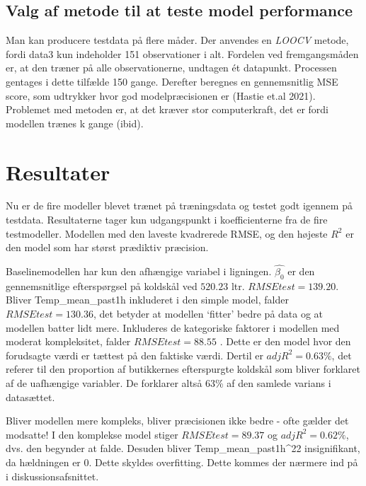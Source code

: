 \documentclass[
  12pt,
  a4paper,
  DIV=11,
  numbers=noendperiod,
  oneside,
  open=any]{scrartcl}
\begin{document}
\hypertarget{valg-af-metode-til-at-teste-model-performance}{%
\subsection{Valg af metode til at teste model
performance}\label{valg-af-metode-til-at-teste-model-performance}}

Man kan producere testdata på flere måder. Der anvendes en \emph{LOOCV}
metode, fordi data3 kun indeholder 151 observationer i alt. Fordelen ved
fremgangsmåden er, at den træner på alle observationerne, undtagen ét
datapunkt. Processen gentages i dette tilfælde 150 gange. Derefter
beregnes en gennemsnitlig MSE score, som udtrykker hvor god
modelpræcisionen er (Hastie et.al 2021). Problemet med metoden er, at
det kræver stor computerkraft, det er fordi modellen trænes k gange
(ibid).

\hypertarget{resultater}{%
\section{Resultater}\label{resultater}}

Nu er de fire modeller blevet trænet på træningsdata og testet godt
igennem på testdata. Resultaterne tager kun udgangspunkt i
koefficienterne fra de fire testmodeller. Modellen med den laveste
kvadrerede RMSE, og den højeste \(R^2\) er den model som har størst
prædiktiv præcision.

Baselinemodellen har kun den afhængige variabel i ligningen.
\(\hat{\beta_0}\) er den gennemsnitlige efterspørgsel på koldskål ved
\(520.23\) ltr. \(RMSEtest=139.20\). Bliver Temp\_mean\_past1h
inkluderet i den simple model, falder \(RMSEtest=130.36\), det betyder
at modellen `fitter' bedre på data og at modellen batter lidt mere.
Inkluderes de kategoriske faktorer i modellen med moderat kompleksitet,
falder \(RMSEtest=88.55\) . Dette er den model hvor den forudsagte værdi
er tættest på den faktiske værdi. Dertil er \(adjR^2 = 0.63\%\), det
referer til den proportion af butikkernes efterspurgte koldskål som
bliver forklaret af de uafhængige variabler. De forklarer altså 63\% af
den samlede varians i datasættet.

Bliver modellen mere kompleks, bliver præcisionen ikke bedre - ofte
gælder det modsatte! I den komplekse model stiger \(RMSEtest=89.37\) og
\(adjR^2 = 0.62\%\), dvs. den begynder at falde. Desuden bliver
Temp\_mean\_past1h\^{}22 insignifikant, da hældningen er 0. Dette
skyldes overfitting. Dette kommes der nærmere ind på i
diskussionsafsnittet.
\end{document}
